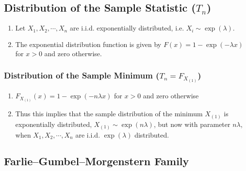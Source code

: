 \subsection{Distribution of the Sample Statistic ($T_n$)}

\begin{enumerate}
    \item Let $X_1 , X_2, \cdots , X _n$ are i.i.d. exponentially distributed, i.e. $X _i \sim \exp(\lambda )$.
    \hfill \cite{statistics/book/Statistics-for-Data-Scientists/Maurits-Kaptein}

    \item The exponential distribution function is given by $F (x) = 1 - \exp (-\lambda x)$ for $x > 0$ and zero otherwise.
    \hfill \cite{statistics/book/Statistics-for-Data-Scientists/Maurits-Kaptein}
\end{enumerate}

\subsubsection{Distribution of the Sample Minimum ($T_n = F _{X_{(1)}}$)}

\begin{enumerate}
    \item $F _{X_{(1)}} (x) = 1 - \exp (-n\lambda x)$ for $x > 0$ and zero otherwise
    \hfill \cite{statistics/book/Statistics-for-Data-Scientists/Maurits-Kaptein}

    \item Thus this implies that the sample distribution of the minimum $X_{(1)}$ is exponentially distributed, $X_{(1)} \sim \exp (n\lambda)$, but now with parameter $n\lambda$, when $X_1 ,X_2, \cdots , X _n$ are i.i.d. $\exp(\lambda)$ distributed.
    \hfill \cite{statistics/book/Statistics-for-Data-Scientists/Maurits-Kaptein}
\end{enumerate}



\subsection{Farlie–Gumbel–Morgenstern Family}

